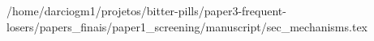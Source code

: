 /home/darciogm1/projetos/bitter-pills/paper3-frequent-losers/papers_finais/paper1_screening/manuscript/sec_mechanisms.tex